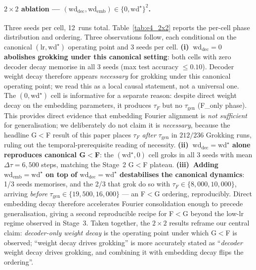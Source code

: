 \documentclass{article}
\newcommand{\taug}{\tau_{\mathrm{gen}}}
\newcommand{\tauf}{\tau_{F}}
\newcommand{\Dtau}{\Delta\tau}
\begin{document}
\paragraph{$2\times 2$ ablation ---
$(\mathrm{wd}_{\mathrm{dec}},\mathrm{wd}_{\mathrm{emb}})\in\{0,\mathrm{wd}^{\star}\}^{2}$.}
Three seeds per cell, 12~runs total.
Table~\ref{tab:e4_2x2} reports the per-cell phase distribution
and ordering.
Three observations follow, each conditional on the canonical
$(\mathrm{lr},\mathrm{wd}^{\star})$ operating point and 3 seeds
per cell.
\textbf{(i)~$\mathrm{wd}_{\mathrm{dec}}{=}0$ abolishes grokking
under this canonical setting}: both cells with zero decoder decay
memorise in all 3 seeds (max test accuracy $\leq 0.10$).
Decoder weight decay therefore appears \emph{necessary} for
grokking under this canonical operating point; we read this as a
local causal statement, not a universal one.
The $(0, \mathrm{wd}^{\star})$ cell is informative for a separate
reason: despite direct weight decay on the embedding parameters,
it produces $\tauf$ but no $\taug$ (F\_only phase).
This provides direct evidence that embedding Fourier alignment is
\emph{not sufficient} for generalisation; we deliberately do not
claim it is \emph{necessary}, because the headline G$<$F result
of this paper places $\tauf$ \emph{after} $\taug$ in
$212/236$ Grokking runs, ruling out the temporal-prerequisite
reading of necessity.
\textbf{(ii)~$\mathrm{wd}_{\mathrm{dec}}{=}\mathrm{wd}^{\star}$
alone reproduces canonical G$<$F}: the
$(\mathrm{wd}^{\star},0)$ cell groks in all 3 seeds with mean
$\Dtau{=}6{,}500$ steps, matching the Stage~2 G$<$F plateau.
\textbf{(iii)~Adding $\mathrm{wd}_{\mathrm{emb}}{=}\mathrm{wd}^{\star}$
on top of $\mathrm{wd}_{\mathrm{dec}}{=}\mathrm{wd}^{\star}$
destabilises the canonical dynamics}: 1/3 seeds memorises, and
the 2/3 that grok do so with $\tauf\in\{8{,}000,10{,}000\}$,
arriving \emph{before} $\taug\in\{19{,}500,16{,}000\}$ --- an
F$<$G ordering, reproducibly.
Direct embedding decay therefore accelerates Fourier consolidation
enough to precede generalisation, giving a second reproducible
recipe for F$<$G beyond the low-lr regime
observed in Stage~3.
Taken together, the $2\times 2$ results reframe our central claim:
\emph{decoder-only weight decay} is the operating point under
which G$<$F is observed; ``weight decay drives grokking'' is
more accurately stated as ``\emph{decoder} weight decay drives
grokking, and combining it with embedding decay flips the
ordering''.
\end{document}

